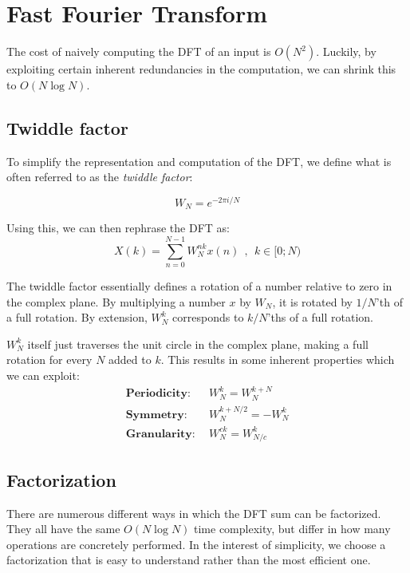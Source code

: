 \section{Fast Fourier Transform}

The cost of naively computing the DFT of an input is $O(N^2)$.
Luckily, by exploiting certain inherent redundancies in the computation,
we can shrink this to $O(N \log N)$.

\subsection{Twiddle factor}

To simplify the representation and computation of the DFT,
we define what is often referred to as the \textit{twiddle factor}:

\begin{equation}
    W_N = e^{-2 \pi i / N}
\end{equation}

Using this, we can then rephrase the DFT as:
\begin{equation}
    X(k) = \sum_{n = 0}^{N - 1} W_N^{nk} x(n)~~,~~k \in [0; N)
\end{equation}

The twiddle factor essentially defines a rotation of a number relative to zero in the complex plane.
By multiplying a number $x$ by $W_N$, it is rotated by $1/N$'th of a full rotation.
By extension, $W_N^{k}$ corresponds to $k/N$'ths of a full rotation.

$W_N^k$ itself just traverses the unit circle in the complex plane,
making a full rotation for every $N$ added to $k$.
This results in some inherent properties which we can exploit:
\begin{align}
    \textbf{Periodicity:} &~~W^k_N = W^{k + N}_N\\
    \textbf{Symmetry:}    &~~W^{k + N/2}_N = -W^k_N\\
    \textbf{Granularity:} &~~W_N^{ck} = W_{N/c}^{k}
\end{align}

\subsection{Factorization}

There are numerous different ways in which the DFT sum can be factorized.
They all have the same $O(N \log N)$ time complexity,
but differ in how many operations are concretely performed.
In the interest of simplicity,
we choose a factorization that is easy to understand rather than the most efficient one.

